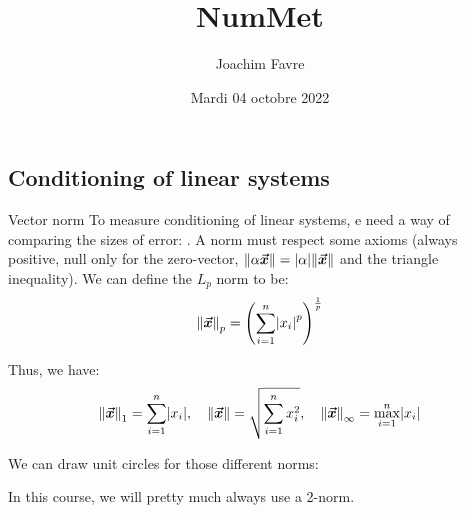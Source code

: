 \documentclass[a4paper]{article}
\title{NumMet}
\author{Joachim Favre}
\date{Mardi 04 octobre 2022}
\begin{document}
\maketitle


\subsection{Conditioning of linear systems}
\begin{parag}{Vector norm}
     To measure conditioning of linear systems, e need a way of comparing the sizes of error: . A norm must respect some axioms (always positive, null only for the zero-vector, $\left\|\alpha \bvec{x}\right\| = \left|\alpha\right| \left\|\bvec{x}\right\|$ and the triangle inequality). We can define the $L_p$ norm to be: 
    \[\left\|\bvec{x}\right\|_p = \left(\sum_{i=1}^{n} \left|x_i\right|^p\right)^{\frac{1}{p}}\]

    Thus, we have: 
    \[\left\|\bvec{x}\right\|_1 = \sum_{i=1}^{n} \left|x_i\right|, \mathspace \left\|\bvec{x}\right\| = \sqrt{\sum_{i=1}^{n} x_i^2}, \mathspace \left\|\bvec{x}\right\|_{\infty} = \max_{i=1}^n \left|x_i\right|\]
    
    We can draw unit circles for those different norms:

    In this course, we will pretty much always use a 2-norm.
\end{parag}
\end{document}

